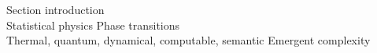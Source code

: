 Section introduction\\
Statistical physics Phase transitions\\
Thermal, quantum, dynamical, computable, semantic Emergent complexity

